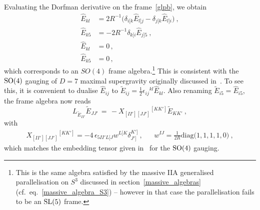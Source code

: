 \documentclass[debug]{phd}
\begin{document}
Evaluating the Dorfman derivative on the frame~\eqref{glpb}, we obtain
\begin{equation}
\begin{split}
\hat{E}_{kl} &= 2R^{-1}\big(\delta_{i[k}\hat{E}_{l]j} -  \delta_{j[k}\hat{E}_{l]i} \big)\ ,\\[1mm]
\hat{E}_{k5}&= -2R^{-1}\delta_{k[i}\hat{E}_{j]5} \ , \\[1mm]
\hat{E}_{kl} &=0 \, , \\[1mm]
\hat{E}_{k5}&= 0 \, ,
\end{split}
\end{equation}
which corresponds to an $SO(4)$ frame algebra.\footnote{This is the same algebra satisfied by the massive IIA generalised parallelisation on $S^3$ discussed in section~\ref{massive_algebras} (cf.~eq.~\eqref{massive_algebra_S3}) -- however in that case the parallelisation fails to be an $\mathrm{SL}(5)$ frame.} This is consistent with the $\mathrm{SO}(4)$ gauging of $D=7$ maximal supergravity originally discussed in~\cite{Samtleben:2005bp}. To see this, it is convenient to dualise $\hat E_{ij}$ to $\widetilde{E}_{ij} = \frac{1}{2} \epsilon_{ij}{}^{kl}\hat{E}_{kl}$. Also renaming $\widetilde{E}_{i5}= \hat{E}_{i5}$, the frame algebra now reads
\begin{equation}
L_{\widetilde{E}_{II'}} \widetilde{E}_{JJ'} \, =\, -X_{[II'][JJ']}{}^{[KK']} \widetilde{E}_{KK'}\ ,
\end{equation}
with
\begin{align}\label{strconst_m_S3}
& & X_{[II'][JJ']}{}^{[KK']} = -4 \, \epsilon_{5II'L[J}w^{L[K}\delta_{J']}^{K']}\ ,& &
w^{IJ} = \frac{1}{2R} \mathrm{diag}\big(1,1,1,1,0\big)\ , & & 
\end{align}
which matches the embedding tensor given in~\cite{Samtleben:2005bp} for the $\mathrm{SO}(4)$ gauging. 
\end{document}
